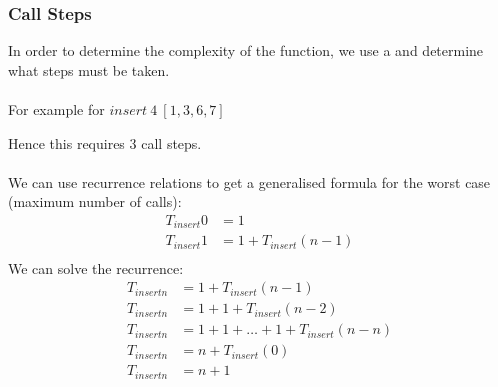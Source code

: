 \documentclass{report}
\begin{document}
\subsubsection*{Call Steps}
In order to determine the complexity of the function, we use a  and determine what steps must be taken.
\\
\\ For example for $insert \ 4 \ [1,3,6,7]$
\\ \begin{steps}
\end{steps}
Hence this requires $3$ call steps.
\\
\\ We can use recurrence relations to get a generalised formula for the worst case (maximum number of calls):
\[\begin{matrix}
		T_{insert} 0 & = 1                   \\
		T_{insert} 1 & = 1 + T_{insert}(n-1) \\
	\end{matrix}\]
We can solve the recurrence:
\[\begin{matrix}
		T_{insert n} & = 1 + T_{insert}(n-1)                 \\
		T_{insert n} & = 1 + 1 + T_{insert}(n-2)             \\
		T_{insert n} & = 1 + 1 + \dots + 1 + T_{insert}(n-n) \\
		T_{insert n} & = n + T_{insert}(0)                   \\
		T_{insert n} & = n + 1                               \\
	\end{matrix}\]
\end{document}
